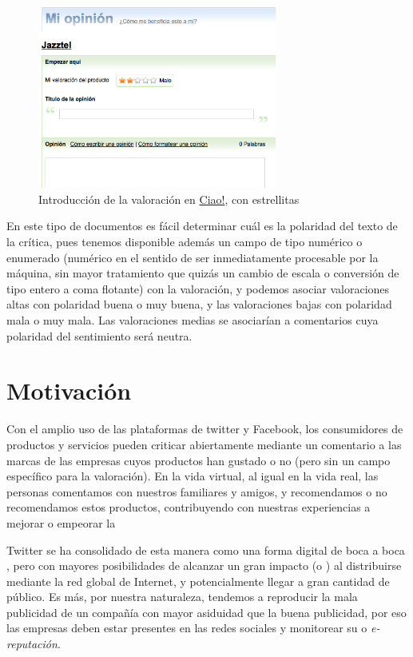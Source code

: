 \begin{figure}[htbp]
\centering
\includegraphics[width=0.7\textwidth]{ciao}
\caption[Introducción de la valoración en ciao.es]{Introducción de la valoración en \href{http://www.ciao.es/}{Ciao!}, con estrellitas}
\label{fig:ciao}
\end{figure}

En este tipo de documentos es fácil determinar cuál es la polaridad del texto de la crítica, pues tenemos disponible además un campo de tipo numérico o enumerado (numérico en el sentido de ser inmediatamente procesable por la máquina, sin mayor tratamiento que quizás un cambio de escala o conversión de tipo entero a coma flotante) con la valoración, y podemos asociar valoraciones altas con polaridad buena o muy buena, y las valoraciones bajas con polaridad mala o muy mala. Las valoraciones medias se asociarían a comentarios cuya polaridad del sentimiento será neutra.

\section{Motivación}

Con el amplio uso de las plataformas de twitter y Facebook, los consumidores de productos y servicios pueden criticar abiertamente mediante un comentario a las marcas de las empresas cuyos productos han gustado o no (pero sin un campo específico para la valoración). En la vida virtual, al igual en la vida real, las personas comentamos con nuestros familiares y amigos, y recomendamos o no recomendamos estos productos, contribuyendo con nuestras experiencias a mejorar o empeorar la 

Twitter se ha consolidado de esta manera como una forma digital de boca a boca \citep{Jansen2009}, pero con mayores posibilidades de alcanzar un gran impacto (o ) al distribuirse mediante la red global de Internet, y potencialmente llegar a gran cantidad de público. Es más, por nuestra naturaleza, tendemos a reproducir la mala publicidad de un compañía con mayor asiduidad que la buena publicidad, por eso las empresas deben estar presentes en las redes sociales y monitorear su  \citep{Leiva2012} o \emph{e-reputación}.

